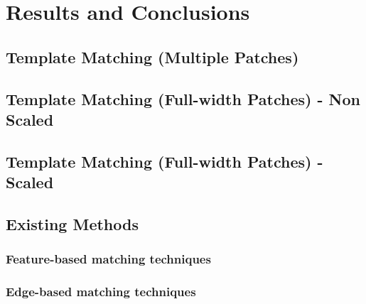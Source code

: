 \chapter{Results and Conclusions}

%
%
%

\section{Template Matching (Multiple Patches)}

\section{Template Matching (Full-width Patches) - Non Scaled}

\section{Template Matching (Full-width Patches) - Scaled}

\section{Existing Methods}

\subsection{Feature-based matching techniques}

\subsection{Edge-based matching techniques}